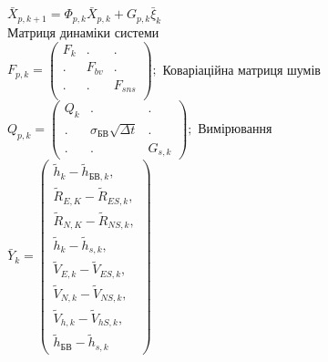 \documentclass[ucs,compress]{beamer}    %
\begin{document}
\begin{frame}[shrink=5]
\begin{columns}[t]
\begin{column}{5cm}
$\bar{X}_{p,k+1} =\Phi_{p,k} \bar{X}_{p,k} +G_{p,k} \bar{\xi }_{k}$ \\
Матриця динаміки системи\\
$ F_{p,k} =\left(\begin{array}{ccc} 
{F_{k} } & {.} & {.} \\
{.} & {F_{bv}} & {.} \\
{.} & {.} & {F_{sns}} \\
\end{array}\right);$
Коваріаційна матриця шумів\\
$Q_{p,k} =\left(\begin{array}{ccc} 
{Q_{k} } & {.} & {.} \\ 
{.} & {\sigma_{\text{БВ}} \sqrt{\Delta t}} & {.} \\ 
{.} & {.} & {G_{s,k} } \end{array}\right);$
Вимірювання\\
$\bar{Y}_{k} = 
\left(\begin{array}{l}
{\tilde{h}_{k} -\tilde{h}_{\text{БВ},k},}\\
{\tilde{R}_{E,K} -\tilde{R}_{ES,k},}\\
{\tilde{R}_{N,K} -\tilde{R}_{NS,k},}\\
{\tilde{h}_{k} -\tilde{h}_{s,k},}\\
{\tilde{V}_{E,k} -\tilde{V}_{ES,k},}\\
{\tilde{V}_{N,k} -\tilde{V}_{NS,k},}\\
{\tilde{V}_{h,k} -\tilde{V}_{hS,k},}\\
{\tilde{h}_{\text{БВ}} -\tilde{h}_{s,k}}
\end{array} \right) $
\end{column}
\end{columns}
\end{frame}


\end{document}
